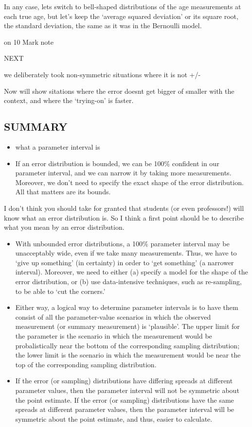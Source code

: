 \documentclass[
]{article}
\begin{document}
In any case, lets switch to bell-shaped distributions of the age
measurements at each true age, but let's keep the `average squared
deviation' or its square root, the standard deviation, the same as it
was in the Bernoulli model.

on 10 Mark note

NEXT

we deliberately took non-symmetric situations where it is not +/-

Now will show sitations where the error doesnt get bigger of smaller
with the context, and where the `trying-on' is faster.

\hypertarget{summary}{%
\subsection{SUMMARY}\label{summary}}

\begin{itemize}
\item
  what a parameter interval is
\item
  If an error distribution is bounded, we can be 100\% confident in our
  parameter interval, and we can narrow it by taking more measurements.
  Moreover, we don't need to specify the exact shape of the error
  distribution. All that matters are its bounds.
\end{itemize}

I don't think you should take for granted that students (or even
professors!) will know what an error distribution is. So I think a first
point should be to describe what you mean by an error distribution.

\begin{itemize}
\item
  With unbounded error distributions, a 100\% parameter interval may be
  unacceptably wide, even if we take many measurements. Thus, we have to
  `give up something' (in certainty) in order to `get something' (a
  narrower interval). Moreover, we need to either (a) specify a model
  for the shape of the error distribution, or (b) use data-intensive
  techniques, such as re-sampling, to be able to `cut the corners.'
\item
  Either way, a logical way to determine parameter intervals is to have
  them consist of all the parameter-value scenarios in which the
  observed measurement (or summary measurement) is `plausible'. The
  upper limit for the parameter is the scenario in which the measurement
  would be probalistically near the bottom of the corresponding sampling
  distribution; the lower limit is the scenario in which the measurement
  would be near the top of the corresponding sampling distribution.
\item
  If the error (or sampling) distributions have differing spreads at
  different parameter values, then the parameter interval will not be
  symmetric about the point estimate. If the error (or sampling)
  distributions have the same spreads at different parameter values,
  then the parameter interval will be symmetric about the point
  estimate, and thus, easier to calculate.
\end{itemize}
\end{document}
